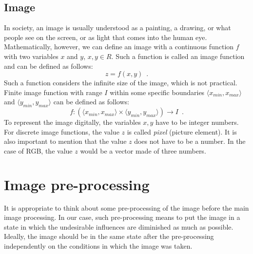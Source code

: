 \documentclass[thesis=B,english]{FITthesis}[2019/12/23]
\begin{document}
        \subsection{Image}
            In society, an image is usually understood as a painting, a drawing, or what people see on the screen, or as light that comes into the human eye. Mathematically, however, we can define an image with a continuous function \(f\) with two variables \(x\) and \(y\), \(x,y \in R\). Such a function is called an image function and can be defined as follows:
            \begin{equation}
                z = f(x,y) \enspace .
            \end{equation}
            Such a function considers the infinite size of the image, which is not practical. Finite image function with range \(I\) within some specific boundaries \(\langle x_{min},x_{max}\rangle\) and \(\langle y_{min},y_{max}\rangle\) can be defined as follows:
            \begin{equation}
                f: (\langle x_{min},x_{max}\rangle \times \langle y_{min},y_{max}\rangle )\to I \enspace .
            \end{equation}
            To represent the image digitally, the variables \(x, y\) have to be integer numbers. For discrete image functions, the value \(z\) is called \emph{pixel} (picture element). It is also important to mention that the value \(z\) does not have to be a number. In the case of RGB, the value \(z\) would be a vector made of three numbers.
            
    \section{Image pre-processing}
        It is appropriate to think about some pre-processing of the image before the main image processing. In our case, such pre-processing means to put the image in a state in which the undesirable influences are diminished as much as possible. Ideally, the image should be in the same state after the pre-processing independently on the conditions in which the image was taken.
        
\end{document}
